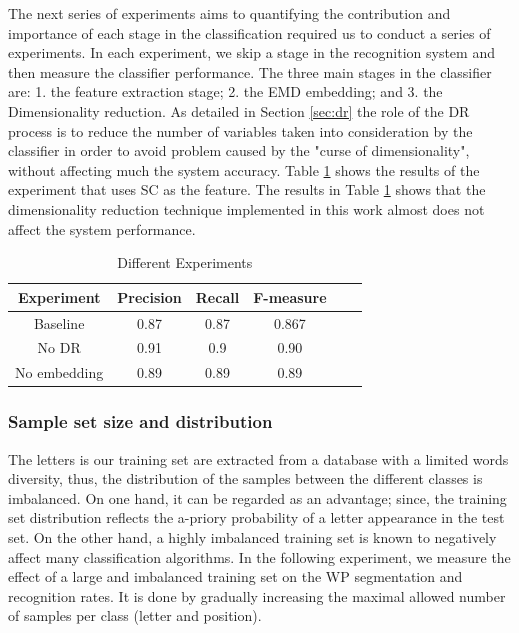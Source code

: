 \documentclass[10pt, conference, compsocconf]{IEEEtran}
\theoremstyle{definition}
\begin{document}
The next series of experiments aims to quantifying the contribution and importance of each stage in the classification required us to conduct a series of experiments.
In each experiment, we skip a stage in the recognition system and then measure the classifier performance.
The three main stages in the classifier are: 1. the feature extraction stage; 2. the EMD embedding; and 3. the Dimensionality reduction.
As detailed in Section \ref{sec:dr} the role of the DR process is to reduce the number of variables taken into consideration by the classifier in order to avoid problem caused by the "curse of dimensionality", without affecting much the system accuracy.
Table \ref{table:dr_embedding_comparison} shows the results of the experiment that uses SC as the feature.
The results in Table \ref{table:dr_embedding_comparison} shows that the dimensionality reduction technique implemented in this work almost does not affect the system performance.


\begin{table}
\centering
\begin{tabular}{ | c | c | c | c | c | c |}
  \hline
  Experiment & Precision & Recall & F-measure\\
  \hline                 
  Baseline &  0.87 & 0.87 & 0.867 \\
  \hline
  No DR & 0.91 & 0.9 & 0.90 \\
  \hline
  No embedding & 0.89 & 0.89 & 0.89 \\
  \hline
\end{tabular}
\caption{Different Experiments}
\label{table:dr_embedding_comparison} 
\end{table}

\subsubsection{Sample set size and distribution}
The letters is our training set are extracted from a database with a limited words diversity, thus, the distribution of the samples between the different classes is imbalanced. 
On one hand, it can be regarded as an advantage; since, the training set distribution reflects the a-priory probability of a letter appearance in the test set. 
On the other hand, a highly imbalanced training set is known to negatively affect many classification algorithms.
In the following experiment, we measure the effect of a large and imbalanced training set on the WP segmentation and recognition rates. 
It is done by gradually increasing the maximal allowed number of samples per class (letter and position).
 
\end{document}
